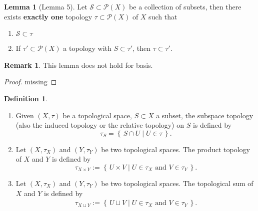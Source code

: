 \documentclass[a4paper]{book}
\theoremstyle{definition}
\newtheorem{definition}{Definition}[chapter]
\newtheorem{lemma}{Lemma}[definition]
\newtheorem*{remark}{Remark}
\newcommand{\makeset}[2]{\left\{\, #1 \mid #2 \,\right\}}
\begin{document}
\begin{thmbox}
    \begin{lemma}[Lemma 5]
    Let \(\mathcal{S} \subset \mathcal{P}(X)\) be a {\color{mathobj}collection of subsets}, then there {\color{maththen}exists} \textbf{exactly one} topology \(\tau \subset \mathcal{P}(X)\) of \(X\) such that
    \begin{enumerate}
        \item \(\mathcal{S} \subset \tau\)
        \item If \(\tau' \subset \mathcal{P}(X)\) a topology with \(S \subset \tau'\), then \(\tau \subset \tau'\).
    \end{enumerate}
    \end{lemma}
\end{thmbox}

\begin{remark}
    This lemma does not hold for basis.
\end{remark}
\begin{proof}
    missing
\end{proof}
\begin{defbox}
    \begin{definition}
        \begin{enumerate}
            \item Given \((X, \tau)\) be a {\color{mathif}topological space}, \(S \subset X\) a subset, the {\color{maththen}subspace topology} (also the induced topology or the relative topology) on \(S\) is defined by
            \begin{equation*}
                \tau_S = \makeset{S \cap U}{U \in \tau} \text{.}
            \end{equation*}
            \item Let \((X, \tau_X)\) and \((Y, \tau_Y)\) be two {\color{mathif}topological spaces}. The product topology of \(X\) and \(Y\) is defined by
            \begin{equation*}
                \tau_{X \times Y} := \makeset{U \times V}{U \in \tau_X \text{ and } V \in \tau_Y} \text{.}
            \end{equation*}
            \item Let \((X, \tau_X)\) and \((Y, \tau_Y)\) be two {\color{mathif}topological spaces}. The topological sum of \(X\) and \(Y\) is defined by
            \begin{align*}
                \tau_{X \sqcup Y} := \makeset{U \sqcup V}{U \in \tau_X \text{ and } V \in \tau_Y} \text{.}
            \end{align*}
        \end{enumerate}
    \end{definition}
\end{defbox}
\end{document}
